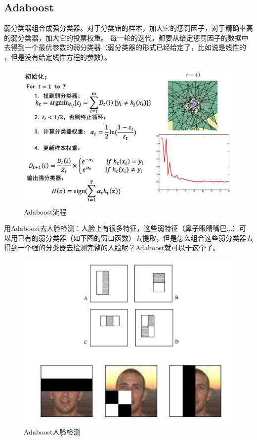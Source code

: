 \documentclass[12pt]{article}
\begin{document}
\subsection{Adaboost}
弱分类器组合成强分类器。对于分类错的样本，加大它的惩罚因子，对于精确率高的弱分类器，加大它的投票权重。
每一轮的迭代，都要从给定惩罚因子的数据中去得到一个最优参数的弱分类器（弱分类器的形式已经给定了，比如说是线性的
，但是没有给定线性方程的参数）。
\begin{figure}[ht]
    \centering
    \includegraphics[scale=0.4]{./img/Adaboost.png}
    \caption{Adaboost流程}
    \label{fig:Adaboost}
\end{figure} 

用Adaboost去人脸检测：人脸上有很多特征，这些弱特征（鼻子眼睛嘴巴...）可以用已有的弱分类器（如下图的窗口函数）去提取，但是怎么组合这些弱分类器去
得到一个强的分类器去检测完整的人脸呢？Adaboost就可以干这个了。
\begin{figure}[ht]
    \centering
    \includegraphics[scale=0.4]{./img/Adaboost_face.png}
    \caption{Adaboost人脸检测}
    \label{fig:Adaboost_face}
\end{figure} 
\end{document}
